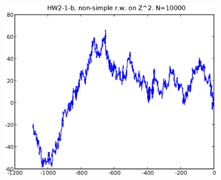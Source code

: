 \documentclass[a4paper,10pt]{article}
\begin{document}
\begin{figure}
\includegraphics[width=1\textwidth]{hw2_1_b_N10000.eps}
\caption{}
\end{figure}
\end{document}
